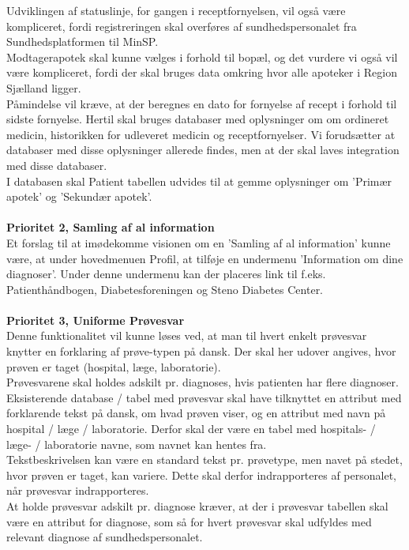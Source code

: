 Udviklingen af statuslinje, for gangen i receptfornyelsen, vil også være kompliceret, fordi registreringen skal overføres af sundhedspersonalet fra Sundhedsplatformen til MinSP.\\
Modtagerapotek skal kunne vælges i forhold til bopæl, og det vurdere vi også vil være kompliceret, fordi der skal bruges data omkring hvor alle apoteker i Region Sjælland ligger.\\
Påmindelse vil kræve, at der beregnes en dato for fornyelse af recept i forhold til sidste fornyelse. Hertil skal bruges databaser med oplysninger om om ordineret medicin, historikken for udleveret medicin og receptfornyelser. Vi forudsætter at databaser med disse oplysninger allerede findes, men at der skal laves integration med disse databaser.\\
I databasen skal Patient tabellen udvides til at gemme oplysninger om 'Primær apotek' og 'Sekundær apotek'.
\\\\
\textbf{Prioritet 2, Samling af al information} \\
Et forslag til at imødekomme visionen om en 'Samling af al information' kunne være, at under hovedmenuen Profil, at tilføje en undermenu 'Information om dine diagnoser'. Under denne undermenu kan der placeres link til f.eks. Patienthåndbogen, Diabetesforeningen og Steno Diabetes Center.
\\\\ 
\textbf{Prioritet 3, Uniforme Prøvesvar} \\
Denne funktionalitet vil kunne løses ved, at man til hvert enkelt prøvesvar knytter en forklaring af prøve-typen på dansk. Der skal her udover angives, hvor prøven er taget (hospital, læge, laboratorie).\\
Prøvesvarene skal holdes adskilt pr. diagnoses, hvis patienten har flere diagnoser.\\
Eksisterende database / tabel med prøvesvar skal have tilknyttet en attribut med forklarende tekst på dansk, om hvad prøven viser, og en attribut med navn på hospital / læge / laboratorie. Derfor skal der være en tabel med hospitals- / læge- / laboratorie navne, som navnet kan hentes fra.\\ 
Tekstbeskrivelsen kan være en standard tekst pr. prøvetype, men navet på stedet, hvor prøven er taget, kan variere. Dette skal derfor indrapporteres af personalet, når prøvesvar indrapporteres. \\
At holde prøvesvar adskilt pr. diagnose kræver, at der i prøvesvar tabellen skal være en attribut for diagnose, som så for hvert prøvesvar skal udfyldes med relevant diagnose af sundhedspersonalet.\\
